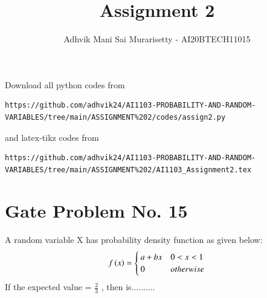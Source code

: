 \documentclass[journal,12pt,twocolumn]{IEEEtran}
\begin{document}
\vspace{3cm}
\title{Assignment 2}
\author{Adhvik Mani Sai Murarisetty - AI20BTECH11015}
\maketitle
\newpage
\bigskip
\renewcommand{\thefigure}{\theenumi}
\renewcommand{\thetable}{\theenumi}
Download all python codes from 
\begin{lstlisting}
https://github.com/adhvik24/AI1103-PROBABILITY-AND-RANDOM-VARIABLES/tree/main/ASSIGNMENT%202/codes/assign2.py
\end{lstlisting}
%
and latex-tikz codes from 
%
\begin{lstlisting}
https://github.com/adhvik24/AI1103-PROBABILITY-AND-RANDOM-VARIABLES/tree/main/ASSIGNMENT%202/AI1103_Assignment2.tex
\end{lstlisting}
\section{Gate Problem No. 15}
A random variable X has probability density
function  as given below:
\begin{align}
f\left(x\right)
= 
\begin{cases}
a+bx & 0<x<1
\\
0 & otherwise
\end{cases}\label{a}
\end{align}
If the expected value  = $\frac{2}{3}$
, then  is..........
\end{document}
